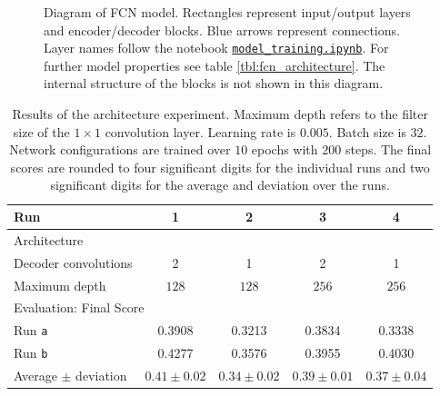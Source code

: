 \documentclass[11pt, onecolumn, oneside, reqno]{article}
\begin{document}
{\begin{figure}
\noindent
{}
\caption[Diagram of FCN model]{Diagram of FCN model. Rectangles represent input/output layers and encoder/decoder blocks. Blue arrows represent connections. Layer names follow the notebook \href{https://github.com/S2H-Mobile/RoboND-DeepLearning-Project-Solution/blob/master/code/model_training.ipynb}{\texttt{model\_training.ipynb}}. For further model properties see table \ref{tbl:fcn_architecture}. The internal structure of the blocks is not shown in this diagram.}
\label{img:reference_architecture}
\end{figure}

{\renewcommand{\arraystretch}{2}%
\begin{table}
\centering
\begin{tabular}{|l|c|c|c|c|}
\hline 
Run & 1 & 2 & 3 & 4 \\
\hline
\multicolumn{5}{l}{Architecture}\\
\hline
Decoder convolutions & 2 & 1 & 2 & 1 \\
Maximum depth   & $128$ & $128$ & $256$ & $256$ \\
\hline
\multicolumn{5}{l}{Evaluation: Final Score}\\
\hline
Run \texttt{a} & 0.3908 & 0.3213 & 0.3834 & 0.3338 \\
Run \texttt{b} & 0.4277 & 0.3576 & 0.3955 & 0.4030 \\
\hline
Average $\pm$ deviation & $0.41 \pm 0.02$ & $0.34 \pm 0.02$ & $0.39 \pm 0.01$ & $0.37 \pm 0.04$ \\
\hline 
\end{tabular}
\caption[Architecture experiment]{Results of the architecture experiment. Maximum depth refers to the filter size of the $1 \times 1$ convolution layer. Learning rate is $0.005$. Batch size is $32$. Network configurations are trained over $10$ epochs with $200$ steps. The final scores are rounded to four significant digits for the individual runs and two significant digits for the average and deviation over the runs.}
\label{tbl:architecture_experiments}
\end{table}

}}
\end{document}
